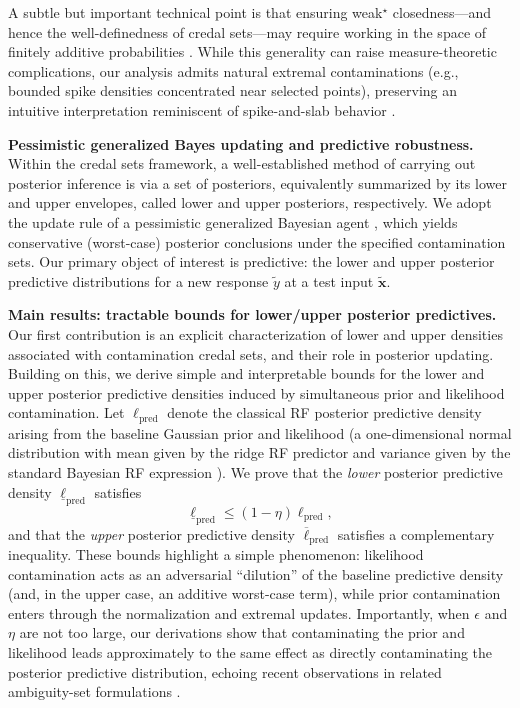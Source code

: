 \documentclass[12pt, english, oneside, a4paper]{article}
\newcommand{\x}{\boldsymbol{x}}
\begin{document}
A subtle but important technical point is that ensuring weak$^\star$ closedness---and hence the well-definedness of credal sets---may require working in the space of finitely additive probabilities \citep{walley}. While this generality can raise measure-theoretic complications, our analysis admits natural extremal contaminations (e.g., bounded spike densities concentrated near selected points), preserving an intuitive interpretation reminiscent of spike-and-slab behavior \citep{louzada}.

\textbf{Pessimistic generalized Bayes updating and predictive robustness.} Within the credal sets framework, a well-established method of carrying out posterior inference is via 
a set of posteriors, equivalently summarized by its lower and upper envelopes, called lower and upper posteriors, respectively. We adopt the update rule of a pessimistic generalized Bayesian agent \citep[Theorem~6.4.6]{walley}, which yields conservative (worst-case) posterior conclusions under the specified contamination sets. Our primary object of interest is predictive: the lower and upper posterior predictive distributions for a new response $\tilde{y}$ at a test input $\tilde{\x}$.

\textbf{Main results: tractable bounds for lower/upper posterior predictives.} Our first contribution is an explicit characterization of lower and upper densities associated with contamination credal sets, and their role in posterior updating. Building on this, we derive simple and interpretable bounds for the lower and upper posterior predictive densities induced by simultaneous prior and likelihood contamination. Let $\ell_{\mathrm{pred}}$ denote the classical RF posterior predictive density arising from the baseline Gaussian prior and likelihood (a one-dimensional normal distribution with mean given by the ridge RF predictor and variance given by the standard Bayesian RF expression \citep{baek2023asymptotics}). We prove that the \emph{lower} posterior predictive density $\underline{\ell}_{\mathrm{pred}}$ satisfies
\begin{equation*}
\underline{\ell}_{\mathrm{pred}} \le (1-\eta) \ell_{\mathrm{pred}},
\end{equation*}
and that the \emph{upper} posterior predictive density $\overline{\ell}_{\mathrm{pred}}$ satisfies a complementary inequality. 
These bounds highlight a simple phenomenon: likelihood contamination acts as an adversarial ``dilution'' of the baseline predictive density (and, in the upper case, an additive worst-case term), while prior contamination enters through the normalization and extremal updates. Importantly, when $\epsilon$ and $\eta$ are not too large, our derivations show that contaminating the prior and likelihood leads approximately to the same effect as directly contaminating the posterior predictive distribution, echoing recent observations in related ambiguity-set formulations \citep{dellaporta2024distributionally}.
\end{document}
